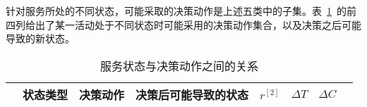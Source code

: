 针对服务所处的不同状态，可能采取的决策动作是上述五类中的子集。表~\ref{table:state_action}~的前四列给出了某一活动处于不同状态时可能采用的决策动作集合，以及决策之后可能导致的新状态。


\begin{table}[htbp]
      \caption{服务状态与决策动作之间的关系}
      \vspace{-0.5em}\label{table:state_action}\centering{}
    \begin{tabular}{rrrrrrrr}
        \toprule
        \multicolumn{1}{c}{} 
        & \multicolumn{1}{c}{状态类型} 
        & \multicolumn{1}{c}{决策动作} 
        & \multicolumn{1}{c}{决策后可能导致的状态} 
        & \multicolumn{1}{c}{$r^{[2]}$} 
        & \multicolumn{1}{c}{$\Delta T$} 
        & \multicolumn{1}{c}{$\Delta C$} \\
        \hline
        

\end{tabular}
\end{table}
